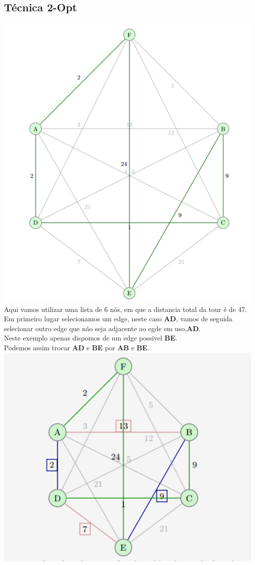 \documentclass[12pt,a4paper,portrait]{article}
\begin{document}
			\subsection{Técnica 2-Opt}	
			\includegraphics[width=1.0\textwidth]{imagens/1}
			Aqui vamos utilizar uma lista de 6 nós, em que a distancia total da tour é de 47.\\
			\newpage
			Em primeiro lugar selecionamos um edge, neste caso \textbf{AD}, vamos de seguida selecionar outro edge que não seja adjacente ao egde em uso,\textbf{AD}.\\
			Neste exemplo apenas dispomos de um edge possivel \textbf{BE}.\\
			Podemos assim trocar \textbf{AD} e \textbf{BE} por \textbf{AB} e \textbf{BE}.\\
			\includegraphics[width=1.0\textwidth]{imagens/2}
\end{document}

